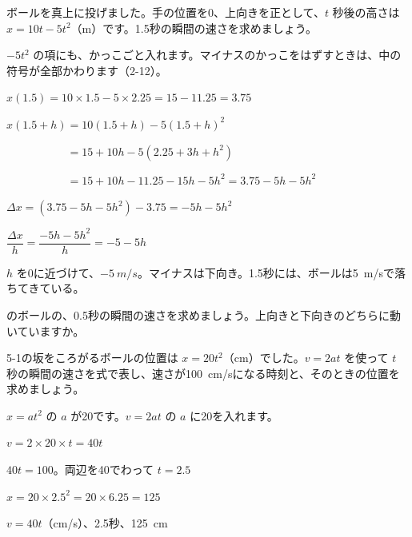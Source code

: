 \begin{reidai}
ボールを真上に投げました。手の位置を0、上向きを正として、$t$ 秒後の高さは $x=10t-5t^2$（m）です。1.5秒の瞬間の速さを求めましょう。\par
\kangaekata $-5t^2$ の項にも、かっこごと入れます。マイナスのかっこをはずすときは、中の符号が全部かわります（2-12）。\par
\shiki $x(1.5)=10\times1.5-5\times2.25=15-11.25=3.75$\par
\hspace*{2.6\zw}$x(1.5+h)=10(1.5+h)-5(1.5+h)^2$\par
\hspace*{2.6\zw}$\phantom{x(1.5+h)}=15+10h-5(2.25+3h+h^2)$\par
\hspace*{2.6\zw}$\phantom{x(1.5+h)}=15+10h-11.25-15h-5h^2=3.75-5h-5h^2$\par
\hspace*{2.6\zw}$\Delta x=(3.75-5h-5h^2)-3.75=-5h-5h^2$\par
\hspace*{2.6\zw}$\dfrac{\Delta x}{h}=\dfrac{-5h-5h^2}{h}=-5-5h$\par
\kotae $h$ を0に近づけて、$\qty{-5}{m/s}$。マイナスは下向き。1.5秒には、ボールは\qty{5}{m/s}で落ちてきている。
\end{reidai}

\begin{jibun}
のボールの、0.5秒の瞬間の速さを求めましょう。上向きと下向きのどちらに動いていますか。
\end{jibun}

\begin{reidai}[$v=2at$ を使う]
5-1の坂をころがるボールの位置は $x=20t^2$（cm）でした。$v=2at$ を使って $t$ 秒の瞬間の速さを式で表し、速さが\qty{100}{cm/s}になる時刻と、そのときの位置を求めましょう。\par
\kangaekata $x=at^2$ の $a$ が20です。$v=2at$ の $a$ に20を入れます。\par
\shiki $v=2\times20\times t=40t$\par
\hspace*{2.6\zw}$40t=100$。両辺を40でわって $t=2.5$\par
\hspace*{2.6\zw}$x=20\times2.5^2=20\times6.25=125$\par
\kotae $v=40t$（cm/s）、2.5秒、\qty{125}{cm}
\end{reidai}

